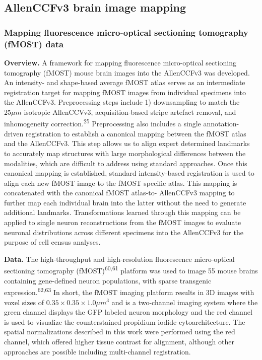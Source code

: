 \documentclass[
  12pt,
]{article}
\begin{document}
\hypertarget{allenccfv3-brain-image-mapping}{%
\subsection{AllenCCFv3 brain image
mapping}\label{allenccfv3-brain-image-mapping}}

\hypertarget{mapping-fluorescence-micro-optical-sectioning-tomography-fmost-data}{%
\subsubsection{Mapping fluorescence micro-optical sectioning tomography
(fMOST)
data}\label{mapping-fluorescence-micro-optical-sectioning-tomography-fmost-data}}

\textbf{Overview.} A framework for mapping fluorescence micro-optical
sectioning tomography (fMOST) mouse brain images into the AllenCCFv3 was
developed. An intensity- and shape-based average fMOST atlas serves as
an intermediate registration target for mapping fMOST images from
individual specimens into the AllenCCFv3. Preprocessing steps include 1)
downsampling to match the \(25 \mu m\) isotropic AllenCCVv3,
acquisition-based stripe artefact removal, and inhomogeneity
correction.\textsuperscript{25} Preprocessing also includes a single
annotation-driven registration to establish a canonical mapping between
the fMOST atlas and the AllenCCFv3. This step allows us to align expert
determined landmarks to accurately map structures with large
morphological differences between the modalities, which are difficult to
address using standard approaches. Once this canonical mapping is
established, standard intensity-based registration is used to align each
new fMOST image to the fMOST specific atlas. This mapping is
concatenated with the canonical fMOST atlas-to- AllenCCFv3 mapping to
further map each individual brain into the latter without the need to
generate additional landmarks. Transformations learned through this
mapping can be applied to single neuron reconstructions from the fMOST
images to evaluate neuronal distributions across different specimens
into the AllenCCFv3 for the purpose of cell census analyses.

\textbf{Data.} The high-throughput and high-resolution fluorescence
micro-optical sectioning tomography (fMOST)\textsuperscript{60,61}
platform was used to image 55 mouse brains containing gene-defined
neuron populations, with sparse transgenic
expression.\textsuperscript{62,63} In short, the fMOST imaging platform
results in 3D images with voxel sizes of
\(0.35 \times 0.35 \times 1.0 \mu m^3\) and is a two-channel imaging
system where the green channel displays the GFP labeled neuron
morphology and the red channel is used to visualize the counterstained
propidium iodide cytoarchitecture. The spatial normalizations described
in this work were performed using the red channel, which offered higher
tissue contrast for alignment, although other approaches are possible
including multi-channel registration.
\end{document}
